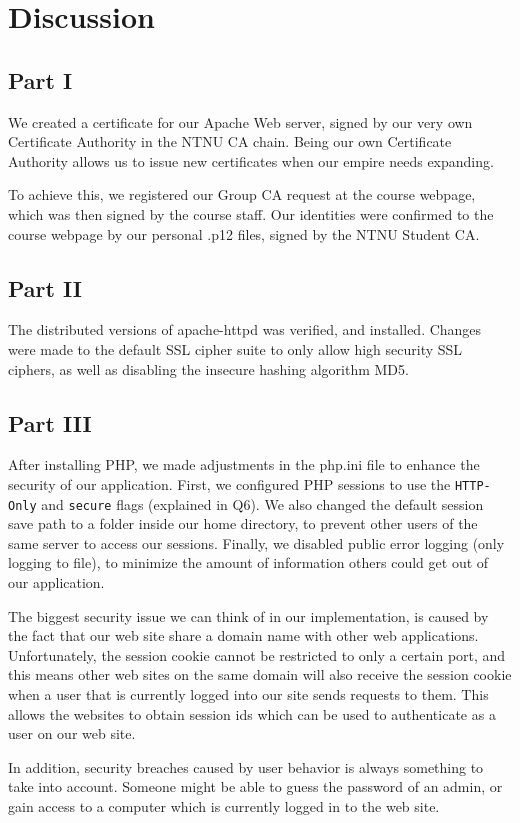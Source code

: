 \section{Discussion}

\subsection{Part I}

We created a certificate for our Apache Web server, signed by our very own Certificate Authority in the NTNU CA chain.
Being our own Certificate Authority allows us to issue new certificates when our empire needs expanding.

To achieve this, we registered our Group CA request at the course webpage, which was then signed by the course staff.
Our identities were confirmed to the course webpage by our personal .p12 files, signed by the NTNU Student CA.

\subsection{Part II}

The distributed versions of apache-httpd was verified, and installed.
Changes were made to the default SSL cipher suite to only allow high security SSL ciphers, as well as disabling the insecure hashing algorithm MD5.

\subsection{Part III}

After installing PHP, we made adjustments in the php.ini file to enhance the security of our application.
First, we configured PHP sessions to use the \verb/HTTP-Only/ and \verb/secure/ flags (explained in Q6).
We also changed the default session save path to a folder inside our home directory, to prevent other users of the same server to access our sessions.
Finally, we disabled public error logging (only logging to file), to minimize the amount of information others could get out of our application.

The biggest security issue we can think of in our implementation, is caused by the fact that our web site share a domain name with other web applications.
Unfortunately, the session cookie cannot be restricted to only a certain port, and this means other web sites on the same domain will also receive the session cookie when a user that is currently logged into our site sends requests to them.
This allows the websites to obtain session ids which can be used to authenticate as a user on our web site.

In addition, security breaches caused by user behavior is always something to take into account.
Someone might be able to guess the password of an admin, or gain access to a computer which is currently logged in to the web site.
